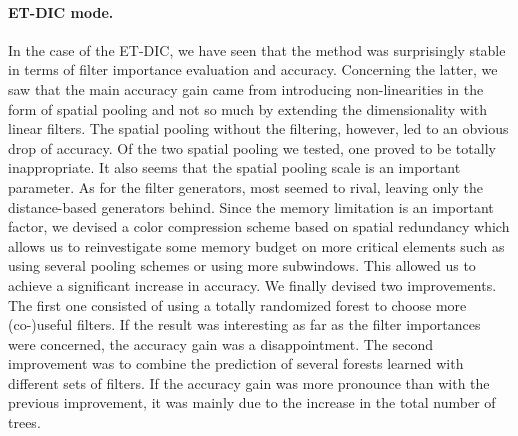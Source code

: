 \documentclass[a4paper]{report}
\begin{document}
\paragraph{ET-DIC mode.}
In the case of the ET-DIC, we have seen that the method was surprisingly stable in terms of filter importance evaluation and accuracy. Concerning the latter, we saw that the main accuracy gain came from introducing non-linearities in the form of spatial pooling and not so much by extending the dimensionality with linear filters. The spatial pooling without the filtering, however, led to an obvious drop of accuracy. Of the two spatial pooling we tested, one proved to be totally inappropriate. It also seems that the spatial pooling scale is an important parameter. As for the filter generators, most seemed to rival, leaving only the distance-based generators behind. Since the memory limitation is an important factor, we devised a color compression scheme based on spatial redundancy which allows us to reinvestigate some memory budget on more critical elements such as using several pooling schemes or using more subwindows. This allowed us to achieve a significant increase in accuracy. We finally devised two improvements. The first one consisted of using a totally randomized forest to choose more (co-)useful filters. If the result was interesting as far as the filter importances were concerned, the accuracy gain was a disappointment. The second improvement was to combine the prediction of several forests learned with different sets of filters. If the accuracy gain was more pronounce than with the previous improvement, it was mainly due to the increase in the total number of trees.
\par
\end{document}
